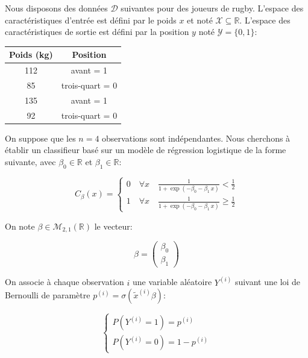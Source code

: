 \documentclass[solutions]{../exercices}
\begin{document}
\begin{exercice}
Nous disposons des données $\mathcal{D}$ suivantes pour des joueurs de rugby. L'espace des caractéristiques d'entrée est défini par le poids $x$ et noté $\mathcal{X} \subseteq \mathbb{R}$. L'espace des caractéristiques de sortie est défini par la position $y$ noté $\mathcal{Y} = \{0, 1\}$:

\begin{center}
	\begin{tabular}{|c|c|}
		\hline
		\textbf{Poids} (kg) & \textbf{Position} \\ \hline
		112 &  avant = 1       \\
		85  &  trois-quart = 0 \\
		135 &  avant = 1       \\
		92  &  trois-quart = 0 \\
		\hline
	\end{tabular}
\end{center}

On suppose que les $n = 4$ observations sont indépendantes. Nous cherchons à établir un classifieur basé sur un modèle de régression logistique de la forme suivante, avec $\beta_0 \in \mathbb{R}$ et $\beta_1 \in \mathbb{R}$:

\begin{equation}
	C_{\beta}(x) = 
	\begin{cases}
		0 \quad \forall x \quad  \displaystyle \frac{1}{1 + \exp{\left(- \beta_0 - \beta_1 \, x\right)}} < \frac{1}{2} \\[10pt]
		1 \quad \forall x \quad  \displaystyle \frac{1}{1 + \exp{\left(- \beta_0 - \beta_1 \, x\right)}} \ge \frac{1}{2}
	\end{cases}
	\nonumber
\end{equation}

On note $\beta \in \mathcal{M}_{2,1}(\mathbb{R})$ le vecteur:

\begin{equation}
	\beta = \begin{pmatrix}\beta_0 \\ \beta_1\end{pmatrix}
	\nonumber
\end{equation}

On associe à chaque observation $i$ une variable aléatoire $Y^{(i)}$ suivant une loi de Bernoulli de paramètre $p^{(i)} = \sigma(\tilde{x}^{(i)} \beta)$:

\begin{equation}
	\begin{cases}
		P(Y^{(i)} = 1) = p^{(i)} \\
		P(Y^{(i)} = 0) = 1 - p^{(i)}
	\end{cases}
	\nonumber
\end{equation}


\end{exercice}
\end{document}

